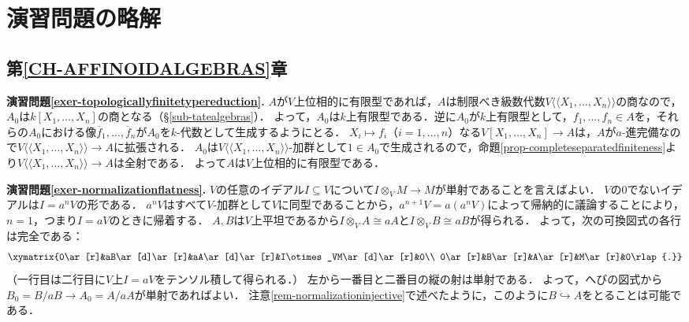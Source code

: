 \documentclass[a4paper,12pt, dvipdfmx]{jsbook}
\def\ovl#1{\overline{#1}}%
\def\dl{\langle\!\langle}
\def\dr{\rangle\!\rangle}
\theoremstyle{plain}
\theoremstyle{definition}
\newcounter{chushaku}
\begin{document}
\clearpage
{}
{\small
\setcounter{chushaku}{0}
\chapter*{演習問題の略解}



\section*{第\ref{CH-AFFINOIDALGEBRAS}章}

\noindent
{\bf 演習問題\ref{exer-topologicallyfinitetypereduction}.} 
$A$が$V$上位相的に有限型であれば，$A$は制限べき級数代数$V\dl X_1,\ldots,X_n\dr$の商なので，$A_0$は$k[X_1,\ldots,X_n]$の商となる（\S\ref{sub-tatealgebras}）．
よって，$A_0$は$k$上有限型である．逆に$A_0$が$k$上有限型として，$f_1,\ldots,f_n\in A$を，それらの$A_0$における像$\ovl{f}_1,\ldots,\ovl{f}_n$が$A_0$を$k$-代数として生成するようにとる．
$X_i\mapsto f_i$（$i=1,\ldots,n$）なる$V[X_1,\ldots,X_n]\rightarrow A$は，$A$が$a$-進完備なので$V\dl X_1,\ldots,X_n\dr\rightarrow A$に拡張される．
$A_0$は$V\dl X_1,\ldots,X_n\dr$-加群として$1\in A_0$で生成されるので，命題\ref{prop-completeseparatedfiniteness}より$V\dl X_1,\ldots,X_n\dr\rightarrow A$は全射である．
よって$A$は$V$上位相的に有限型である．

\medskip\noindent
{\bf 演習問題\ref{exer-normalizationflatness}.}
$V$の任意のイデアル$I\subseteq V$について$I\otimes_VM\rightarrow M$が単射であることを言えばよい．
$V$の$0$でないイデアルは$I=a^nV$の形である．
$a^nV$はすべて$V$-加群として$V$に同型であることから，$a^{n+1}V=a(a^nV)$によって帰納的に議論することにより，$n=1$，つまり$I=aV$のときに帰着する．
$A,B$は$V$上平坦であるから$I\otimes_VA\cong aA$と$I\otimes_VB\cong aB$が得られる．
よって，次の可換図式の各行は完全である：
$$
\xymatrix{0\ar[r]&aB\ar[d]\ar[r]&aA\ar[d]\ar[r]&I\otimes_VM\ar[d]\ar[r]&0\\ 0\ar[r]&B\ar[r]&A\ar[r]&M\ar[r]&0\rlap{.}}
$$
（一行目は二行目に$V$上$I=aV$をテンソル積して得られる．）
左から一番目と二番目の縦の射は単射である．
よって，へびの図式から$B_0=B/aB\rightarrow A_0=A/aA$が単射であればよい．
注意\ref{rem-normalizationinjective}で述べたように，このように$B\hookrightarrow A$をとることは可能である．

}
\end{document}
